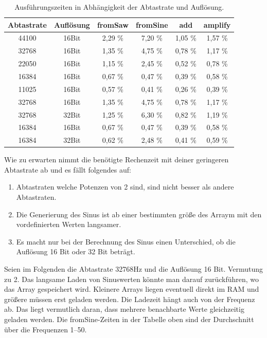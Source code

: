 \begin{table}[h]
    \centering
    \begin{tabular}{|c|c|c|c|c|c|}
        \hline
        Abtastrate & Auflösung & fromSaw & fromSine & add & amplify \\
        \hline
        \hline
        44100 & 16Bit & 2,29 \% & 7,20 \% & 1,05 \% & 1,57 \% \\
        32768 & 16Bit & 1,35 \% & 4,75 \% & 0,78 \% & 1,17 \% \\
        22050 & 16Bit & 1,15 \% & 2,45 \% & 0,52 \% & 0,78 \% \\
        16384 & 16Bit & 0,67 \% & 0,47 \% & 0,39 \% & 0,58 \% \\
        11025 & 16Bit & 0,57 \% & 0,41 \% & 0,26 \% & 0,39 \% \\
        \hline
        \hline
        32768 & 16Bit & 1,35 \% & 4,75 \% & 0,78 \% & 1,17 \% \\
        32768 & 32Bit & 1,25 \% & 6,30 \% & 0,82 \% & 1,19 \% \\
        \hline
        \hline
        16384 & 16Bit & 0,67 \% & 0,47 \% & 0,39 \% & 0,58 \% \\
        16384 & 32Bit & 0,62 \% & 2,48 \% & 0,41 \% & 0,59 \% \\
        \hline
    \end{tabular}
    \caption{Ausführungszeiten  in Abhängigkeit der Abtastrate und Auflösung.}
\end{table}

Wie zu erwarten nimmt die benötigte Rechenzeit mit deiner geringeren Abtastrate ab
und es fällt folgendes auf:
\begin{enumerate}
    \item Abtastraten welche Potenzen von 2 sind, sind nicht besser als andere Abtastraten.
    \item Die Generierung des Sinus ist ab einer bestimmten größe des Arraym mit den vordefinierten Werten langsamer.
    \item Es macht nur bei der Berechnung des Sinus einen Unterschied, ob die Auflösung 16 Bit oder 32 Bit beträgt.
\end{enumerate}

Seien im Folgenden die Abtastrate 32768Hz und die Auflösung 16 Bit.
Vermutung zu 2. Das langsame Laden von Sinuswerten könnte man darauf zurückführen,
wo das Array gespeichert wird. Kleinere Arrays liegen eventuell direkt im RAM und größere
müssen erst geladen werden. Die Ladezeit hängt auch von der Frequenz ab. Das liegt
vermutlich daran, dass mehrere benachbarte Werte gleichzeitig geladen werden.
Die fromSine-Zeiten in der Tabelle oben sind der Durchschnitt über die Frequenzen 1--50.

